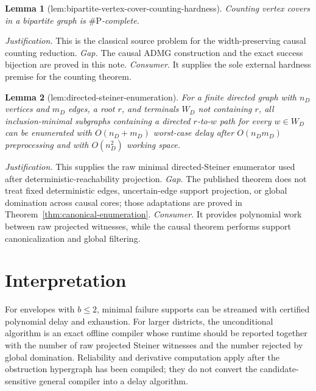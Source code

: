 \documentclass{article}
\newtheorem{lemma}{Lemma}
\begin{document}
\begin{lemma}[lem:bipartite-vertex-cover-counting-hardness]\label{lem:bipartite-vertex-cover-counting-hardness}
Counting vertex covers in a bipartite graph is \(\#\mathrm P\)-complete.
\end{lemma}
\par\smallskip\noindent \textit{Justification.} This is the classical source problem for the width-preserving causal counting reduction. \textit{Gap.} The causal ADMG construction and the exact success bijection are proved in this note. \textit{Consumer.} It supplies the sole external hardness premise for the counting theorem.

\begin{lemma}[lem:directed-steiner-enumeration]\label{lem:directed-steiner-enumeration}
For a finite directed graph with \(n_D\) vertices and \(m_D\) edges, a root \(r\), and terminals \(W_D\) not containing \(r\), all inclusion-minimal subgraphs containing a directed \(r\)-to-\(w\) path for every \(w\in W_D\) can be enumerated with \(O(n_D+m_D)\) worst-case delay after \(O(n_Dm_D)\) preprocessing and with \(O(n_D^2)\) working space.
\end{lemma}
\par\smallskip\noindent \textit{Justification.} This supplies the raw minimal directed-Steiner enumerator used after deterministic-reachability projection. \textit{Gap.} The published theorem does not treat fixed deterministic edges, uncertain-edge support projection, or global domination across causal cores; those adaptations are proved in Theorem~\ref{thm:canonical-enumeration}. \textit{Consumer.} It provides polynomial work between raw projected witnesses, while the causal theorem performs support canonicalization and global filtering.

\section{Interpretation}

For envelopes with \(b\le2\), minimal failure supports can be streamed with certified polynomial delay and exhaustion.  For larger districts, the unconditional algorithm is an exact offline compiler whose runtime should be reported together with the number of raw projected Steiner witnesses and the number rejected by global domination.  Reliability and derivative computation apply after the obstruction hypergraph has been compiled; they do not convert the candidate-sensitive general compiler into a delay algorithm.
\end{document}

